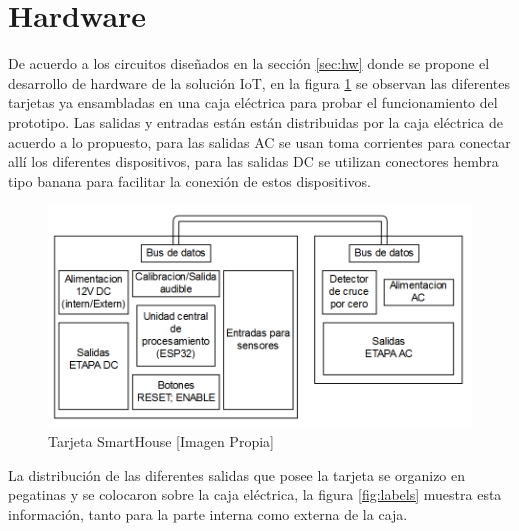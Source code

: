 \section{Hardware}

De acuerdo a los circuitos diseñados en la sección \ref{sec:hw} donde se propone el desarrollo de hardware de la solución IoT, en la figura \ref{fig:tarjeta} se observan las diferentes tarjetas ya ensambladas en una caja eléctrica para probar el funcionamiento del prototipo. Las salidas y entradas están están distribuidas por la caja eléctrica de acuerdo a lo propuesto, para las salidas AC se usan toma corrientes para conectar allí los diferentes dispositivos, para las salidas DC se utilizan conectores hembra tipo banana para facilitar la conexión de estos dispositivos.\\

\begin{figure}[H]
	\centering
	\caption{Tarjeta SmartHouse [Imagen Propia]}
	\label{fig:tarjeta}
	\includegraphics[width=0.6\linewidth]{Imagenes/Tarjeta}
\end{figure}


La distribución de las diferentes salidas que posee la tarjeta se organizo en pegatinas y se colocaron sobre la caja eléctrica, la figura \ref{fig:labels} muestra esta información, tanto para la parte interna como externa de la caja.\\

